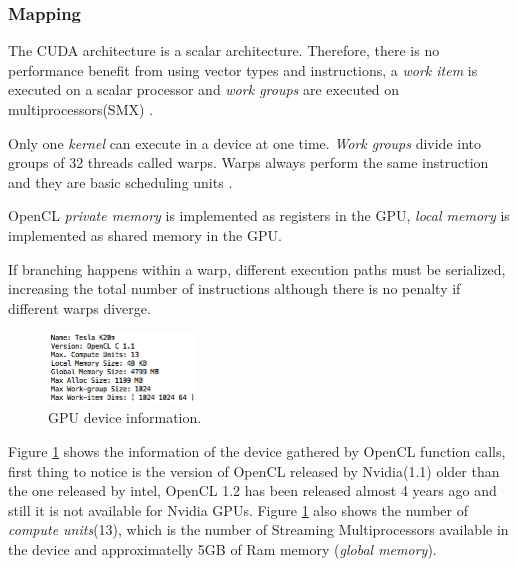 \subsubsection{Mapping}
\par{The CUDA architecture is a scalar architecture. Therefore, there is no performance benefit from using vector types and 
    instructions, a \emph{work item} is executed on a scalar processor and \emph{work groups} are executed on multiprocessors(SMX)
    \cite{gpu_opencl_cuda,gpu_opencl_opt_slides}.}

\par{Only one \emph{kernel} can execute in a device at one time. \emph{Work groups} divide into groups of 32 threads called warps. 
    Warps always perform the same instruction and they are basic scheduling units \cite{gpu_opencl_opt_slides}.}

\par{OpenCL \emph{private memory} is implemented as registers in the GPU, \emph{local memory} is implemented as shared memory 
    in the GPU\cite{gpu_opencl_opt_slides}.}

\par{If branching happens within a warp, different execution paths must be serialized, increasing the total number of 
    instructions although there is no penalty if different warps diverge\cite{gpu_opencl_opt_slides}.}

\begin{figure}[!h]
    \centering
    \includegraphics[width=0.35\textwidth]{figures/gpu_device_info.png}
    \caption{GPU device information.}
    \label{GpuDeviceInfo}
\end{figure}

\par{Figure \ref{GpuDeviceInfo} shows the information of the device gathered by OpenCL function calls, first thing to notice is 
    the version of OpenCL released by Nvidia(1.1) older than the one released by intel, OpenCL 1.2 has been released almost 4 years
    ago and still it is not available for Nvidia GPUs. Figure \ref{GpuDeviceInfo} also shows the number of \emph{compute units}(13),
    which is the number of Streaming Multiprocessors available in the device and approximatelly 5GB of Ram memory
    (\emph{global memory}).}




